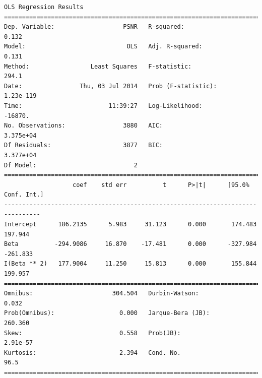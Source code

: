 \documentclass[11pt]{article}
\theoremstyle{definition}
\begin{document}
{\begin{lstlisting}[caption = Time Series 2 - Non-Local Means OLS Model - $\beta$ Only, label = {nlmeansbeta2}]
                            OLS Regression Results                            
==============================================================================
Dep. Variable:                   PSNR   R-squared:                       0.132
Model:                            OLS   Adj. R-squared:                  0.131
Method:                 Least Squares   F-statistic:                     294.1
Date:                Thu, 03 Jul 2014   Prob (F-statistic):          1.23e-119
Time:                        11:39:27   Log-Likelihood:                -16870.
No. Observations:                3880   AIC:                         3.375e+04
Df Residuals:                    3877   BIC:                         3.377e+04
Df Model:                           2                                         
================================================================================
                   coef    std err          t      P>|t|      [95.0% Conf. Int.]
--------------------------------------------------------------------------------
Intercept      186.2135      5.983     31.123      0.000       174.483   197.944
Beta          -294.9086     16.870    -17.481      0.000      -327.984  -261.833
I(Beta ** 2)   177.9004     11.250     15.813      0.000       155.844   199.957
==============================================================================
Omnibus:                      304.504   Durbin-Watson:                   0.032
Prob(Omnibus):                  0.000   Jarque-Bera (JB):              260.360
Skew:                           0.558   Prob(JB):                     2.91e-57
Kurtosis:                       2.394   Cond. No.                         96.5
==============================================================================
\end{lstlisting}

}
\end{document}
